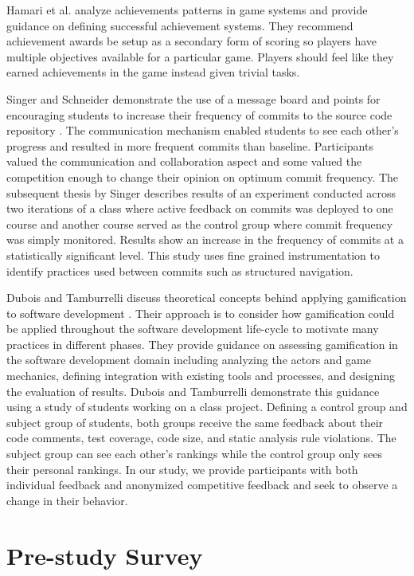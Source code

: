 \documentclass{sig-alternate}
\begin{document}
Hamari et al. analyze achievements patterns in game systems and provide guidance on defining successful achievement systems.  They recommend achievement awards be setup as a secondary form of scoring so players have multiple objectives available for a particular game.  Players should feel like they earned achievements in the game instead given trivial tasks.

Singer and Schneider demonstrate the use of a message board and points for encouraging students to increase their frequency of commits to the source code repository \cite{Singer2012It}.  The communication mechanism enabled students to see each other's progress and resulted in more frequent commits than baseline.  Participants valued the communication and collaboration aspect and some valued the competition enough to change their opinion on optimum commit frequency.  The subsequent thesis by Singer \cite{Singer2013a} describes results of an experiment conducted across two iterations of a class where active feedback on commits was deployed to one course and another course served as the control group where commit frequency was simply monitored.  Results show an increase in the frequency of commits at a statistically significant level.  This study uses fine grained instrumentation to identify practices used between commits such as structured navigation.

Dubois and Tamburrelli discuss theoretical concepts behind applying gamification to software development \cite{Dubois2013Understanding}. Their approach is to consider how gamification could be applied throughout the software development life-cycle to motivate many practices in different phases.  They provide guidance on assessing gamification in the software development domain including analyzing the actors and game mechanics, defining integration with existing tools and processes, and designing the evaluation of results.  Dubois and Tamburrelli demonstrate this guidance using a study of students working on a class project.  Defining a control group and subject group of students, both groups receive the same feedback about their code comments, test coverage, code size, and static analysis rule violations.  The subject group can see each other's rankings while the control group only sees their personal rankings.  In our study, we provide participants with both individual feedback and anonymized competitive feedback and seek to observe a change in their behavior.

\section{Pre-study Survey}
\end{document}
